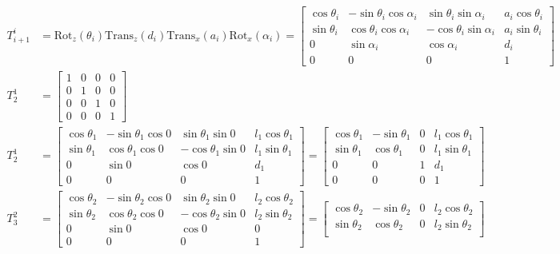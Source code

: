 \documentclass[10pt]{article}
\begin{document}
\begin{enumerate}
	\begin{align*}
		T_{i+1}^i &= \text{Rot}_z(\theta_i) \text{Trans}_z(d_i) \text{Trans}_x(a_i) \text{Rot}_x(\alpha_i) = \begin{bmatrix}
		\cos\theta_i & -\sin\theta_i \cos\alpha_i &\sin\theta_i \sin\alpha_i & a_i \cos\theta_i \\
		\sin\theta_i & \cos\theta_i \cos\alpha_i & -\cos\theta_i \sin\alpha_i & a_i \sin\theta_i \\
		0 & \sin\alpha_i & \cos\alpha_i & d_i \\
		0 & 0 & 0 & 1
		\end{bmatrix}
		\\
		T_{2}^1 &= \begin{bmatrix}
		1 & 0 & 0 & 0 \\
		0 & 1 & 0 & 0 \\
		0 & 0 & 1 & 0 \\
		0 & 0 & 0 & 1
		\end{bmatrix}
		\\
		T_{2}^1 &= \begin{bmatrix}
		\cos\theta_1 & -\sin\theta_1 \cos 0 &\sin\theta_1 \sin 0 & l_1 \cos\theta_1 \\
		\sin\theta_1 & \cos\theta_1 \cos 0 & -\cos\theta_1 \sin 0 & l_1 \sin\theta_1 \\
		0 & \sin 0 & \cos 0 & d_1 \\
		0 & 0 & 0 & 1
		\end{bmatrix} = \begin{bmatrix}
		\cos\theta_1 & -\sin\theta_1 & 0 & l_1 \cos\theta_1 \\
		\sin\theta_1 & \cos\theta_1 & 0 & l_1 \sin\theta_1 \\
		0 & 0 & 1 & d_1 \\
		0 & 0 & 0 & 1
		\end{bmatrix}
		\\
		T_{3}^2 &= \begin{bmatrix}
		\cos\theta_2 & -\sin\theta_2 \cos 0 &\sin\theta_2 \sin 0 & l_2 \cos\theta_2 \\
		\sin\theta_2 & \cos\theta_2 \cos 0  & -\cos\theta_2 \sin 0 & l_2 \sin\theta_2 \\
		0 & \sin 0 & \cos 0 & 0 \\
		0 & 0 & 0 & 1
		\end{bmatrix} = \begin{bmatrix}
		\cos\theta_2 & -\sin\theta_2 & 0 & l_2 \cos\theta_2 \\
		\sin\theta_2 & \cos\theta_2 & 0 & l_2 \sin\theta_2 \\

\end{bmatrix}
\end{align*}
\end{enumerate}
\end{document}
